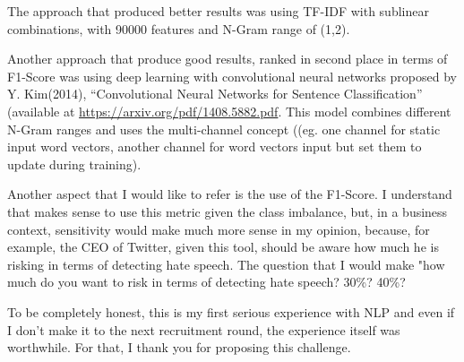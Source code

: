 \documentclass{article}
\begin{document}
	The approach that produced better results was using TF-IDF with sublinear combinations, with 90000 features and N-Gram range of (1,2).
	
	Another approach that produce good results, ranked in second place in terms of F1-Score was using deep learning with convolutional neural networks proposed by Y. Kim(2014), “Convolutional Neural Networks for Sentence Classification” (available at \url{ https://arxiv.org/pdf/1408.5882.pdf}. This model combines different N-Gram ranges and uses the multi-channel concept ((eg. one channel for static input word vectors, another channel for word vectors input but set them to update during training).
	 
	Another aspect that I would like to refer is the use of the F1-Score. I understand that makes sense to use this metric given the class imbalance, but, in a business context, sensitivity would make much more sense in my opinion, because, for example, the CEO of Twitter, given this tool, should be aware how much he is risking in terms of detecting hate speech. The question that I would make "how much do you want to risk in terms of detecting hate speech? 30\%? 40\%?
	
	To be completely honest, this is my first serious experience with NLP and even if I don't make it to the next recruitment round, the experience itself was worthwhile. For that, I thank you for proposing this challenge. 
	
	
	
\end{document}
